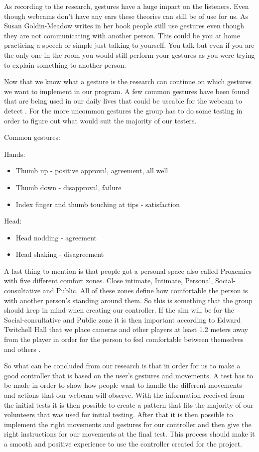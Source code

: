 As recording to the research, gestures have a huge impact on the listeners. Even though webcams don’t have any ears these theories can still be of use for us. As Susan Goldin-Meadow writes in her book \parencite{Meadow2005} people still use gestures even though they are not communicating with another person. This could be you at home practicing a speech or simple just talking to yourself. You talk but even if you are the only one in the room you would still perform your gestures as you were trying to explain something to another person.

Now that we know what a gesture is the research can continue on which gestures we want to implement in our program. A few common gestures have been found that are being used in our daily lives that could be useable for the webcam to detect \parencite{Businessballs}. For the more uncommon gestures the group has to do some testing in order to figure out what would suit the majority of our testers.
\bigskip

Common gestures:

Hands:
\begin{itemize}
\item Thumb up - positive approval, agreement, all well
\item Thumb down - disapproval, failure
\item Index finger and thumb touching at tips - satisfaction
\end{itemize}

Head:
\begin{itemize}
\item Head nodding - agreement
\item Head shaking - disagreement
\end{itemize}
\bigskip

A last thing to mention is that people got a personal space also called Proxemics with five different comfort zones. Close intimate, Intimate, Personal, Social-consultative and Public. All of these zones define how comfortable the person is with another person’s standing around them. So this is something that the group should keep in mind when creating our controller. If the aim will be for the Social-consultative and Public zone it is then important according to Edward Twitchell Hall that we place cameras and other players at least 1.2 meters away from the player in order for the person to feel comfortable between themselves and others \parencite{Businessballs}.

So what can be concluded from our research is that in order for us to make a good controller that is based on the user’s gestures and movements. A test has to be made in order to show how people want to handle the different movements and actions that our webcam will observe. With the information received from the initial tests it is then possible to create a pattern that fits the majority of our volunteers that was used for initial testing. After that it is then possible to implement the right movements and gestures for our controller and then give the right instructions for our movements at the final test.  This process should make it a smooth and positive experience to use the controller created for the project.
